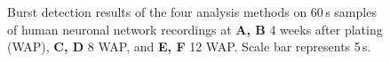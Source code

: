 \documentclass[12pt, titlepage]{article}
\begin{document}
		\begin{figure}[h]
			\centering
			\caption{Burst detection results of the four analysis methods on 60$\,$s samples of human neuronal network recordings at \textbf{A, B} 4 weeks after plating (WAP), \textbf{C, D} 8 WAP, and \textbf{E, F} 12 WAP. Scale bar represents 5$\,$s.}
			\label{hiPSN_examples}
		\end{figure}
		\clearpage
		 
		
	
\end{document}

